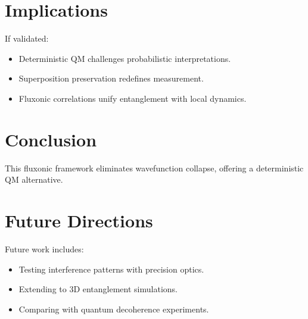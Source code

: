 \documentclass{article}
\begin{document}
\section{Implications}
If validated:
\begin{itemize}
    \item Deterministic QM challenges probabilistic interpretations.
    \item Superposition preservation redefines measurement.
    \item Fluxonic correlations unify entanglement with local dynamics.
\end{itemize}

\section{Conclusion}
This fluxonic framework eliminates wavefunction collapse, offering a deterministic QM alternative.

\section{Future Directions}
Future work includes:
\begin{itemize}
    \item Testing interference patterns with precision optics.
    \item Extending to 3D entanglement simulations.
    \item Comparing with quantum decoherence experiments.
\end{itemize}
\end{document}
